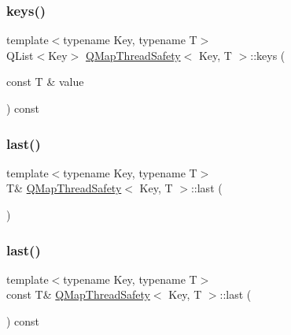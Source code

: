 \mbox{\label{class_q_map_thread_safety_a721c6cae55a5c046a2fca6efc8fa49c3}} 
\subsubsection{\texorpdfstring{keys()}{keys()}\hspace{0.1cm}{\footnotesize\ttfamily [2/2]}}
{\footnotesize\ttfamily template$<$typename Key, typename T$>$ \\
Q\+List$<$Key$>$ \hyperlink{class_q_map_thread_safety}{Q\+Map\+Thread\+Safety}$<$ Key, T $>$\+::keys (\begin{DoxyParamCaption}\item[{const T \&}]{value }\end{DoxyParamCaption}) const\hspace{0.3cm}{\ttfamily [inline]}}

\mbox{\label{class_q_map_thread_safety_a87a87d963bc7624cc6330060d5a65f85}} 
\subsubsection{\texorpdfstring{last()}{last()}\hspace{0.1cm}{\footnotesize\ttfamily [1/2]}}
{\footnotesize\ttfamily template$<$typename Key, typename T$>$ \\
T\& \hyperlink{class_q_map_thread_safety}{Q\+Map\+Thread\+Safety}$<$ Key, T $>$\+::last (\begin{DoxyParamCaption}{ }\end{DoxyParamCaption})\hspace{0.3cm}{\ttfamily [inline]}}

\mbox{\label{class_q_map_thread_safety_a60bbb036a7cb0b05254a0171ad81e2db}} 
\subsubsection{\texorpdfstring{last()}{last()}\hspace{0.1cm}{\footnotesize\ttfamily [2/2]}}
{\footnotesize\ttfamily template$<$typename Key, typename T$>$ \\
const T\& \hyperlink{class_q_map_thread_safety}{Q\+Map\+Thread\+Safety}$<$ Key, T $>$\+::last (\begin{DoxyParamCaption}{ }\end{DoxyParamCaption}) const\hspace{0.3cm}{\ttfamily [inline]}}

